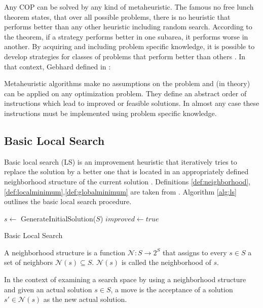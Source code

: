 Any COP can be solved by any kind of metaheuristic. The famous no free lunch theorem \cite{wolpert-97} states, that over all possible problems, there is no heuristic that performs better than any other heuristic including random search. According to the theorem, if a strategy performs better in one subarea, it performs worse in another. By acquiring and including problem specific knowledge, it is possible to develop strategies for classes of problems that perform better than others \cite{chiong-09}. In that context, Gebhard defined in \cite{gebhard-12}:
\begin{definition}
Metaheuristic algorithms make no assumptions on the problem and (in theory) can be applied on any optimization problem. They define an abstract order of instructions which lead to improved or feasible solutions. In almost any case these instructions must be implemented using problem specific knowledge.
\end{definition}


\subsection{Basic Local Search}
Basic local search (LS) is an improvement heuristic that iteratively tries to replace the solution by a better one that is located in an appropriately defined neighborhood structure of the current solution \cite{blum-05}. Definitions \ref{def:neighborhood},\ref{def:localminimum},\ref{def:globalminimum} are taken from \cite{leitner-06}. Algorithm \ref{alg:ls} outlines the basic local search procedure. 

\begin{algorithm}[h]
$s \gets$ GenerateInitialSolution($S$)\;
$improved \gets true$\;
\caption{Basic Local Search}
\label{alg:ls}
\end{algorithm}

\begin{definition}
A neighborhood structure is a function $\mathcal{N} : S \rightarrow 2^S$ that assigns to every $s \in S$ a set of neighbors $\mathcal{N}(s) \subseteq S$. $\mathcal{N}(s)$ is called the neighborhood of $s$.
\label{def:neighborhood}
\end{definition}

\begin{definition}[Move]
In the context of examining a search space by using a neighborhood structure and given an actual solution $s\in S$, a move is the acceptance of a solution $s'\in\mathcal{N}(s)$ as the new actual solution.
\end{definition}

